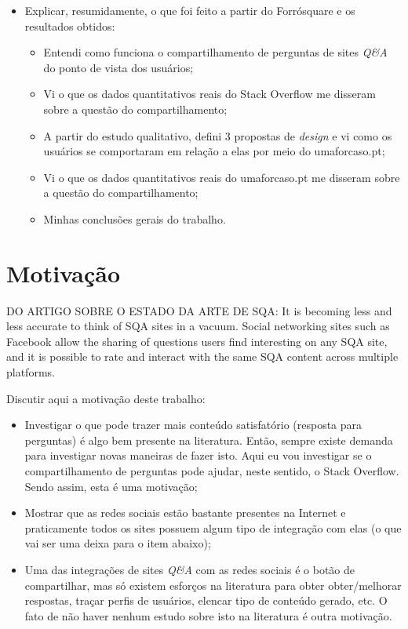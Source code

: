 \begin{itemize}
        \item Explicar, resumidamente, o que foi feito a partir do Forrósquare e os resultados obtidos:
            \begin{itemize}
                \item Entendi como funciona o compartilhamento de perguntas de sites \textit{Q\&A} do ponto de vista dos usuários;
                \item Vi o que os dados quantitativos reais do Stack Overflow me disseram sobre a questão do compartilhamento;
                \item A partir do estudo qualitativo, defini 3 propostas de \textit{design} e vi como os usuários se comportaram em relação a elas por meio do umaforcaso.pt;
                \item Vi o que os dados quantitativos reais do umaforcaso.pt me disseram sobre a questão do compartilhamento;
                \item Minhas conclusões gerais do trabalho.
            \end{itemize}
\end{itemize}

\section{Motivação}

DO ARTIGO SOBRE O ESTADO DA ARTE DE SQA: It is becoming less and less accurate to think of SQA sites in a vacuum. Social networking sites such as Facebook allow the sharing of questions users find interesting on any SQA site, and it is possible to rate and interact with the same SQA content across multiple platforms.

    Discutir aqui a motivação deste trabalho:
    \begin{itemize}
        \item Investigar o que pode trazer mais conteúdo satisfatório (resposta para perguntas) é algo bem presente na literatura. Então, sempre existe demanda para investigar novas maneiras de fazer isto. Aqui eu vou investigar se o compartilhamento de perguntas pode ajudar, neste sentido, o Stack Overflow. Sendo assim, esta é uma motivação;
        \item Mostrar que as redes sociais estão bastante presentes na Internet e praticamente todos os sites possuem algum tipo de integração com elas (o que vai ser uma deixa para o item abaixo);
        \item Uma das integrações de sites \textit{Q\&A} com as redes sociais é o botão de compartilhar, mas só existem esforços na literatura para obter obter/melhorar respostas, traçar perfis de usuários, elencar tipo de conteúdo gerado, etc. O fato de não haver nenhum estudo sobre isto na literatura é outra motivação.
    \end{itemize}
